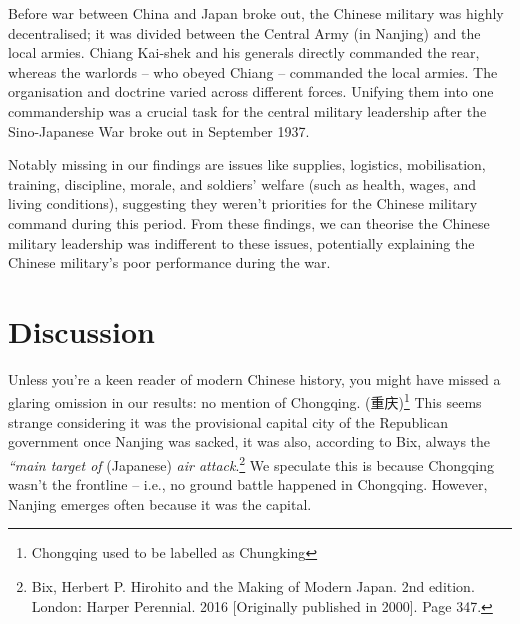 \documentclass[12pt,letterpaper]{article}
\begin{document}
\begin{CJK*}{UTF8}{gbsn}
		\vspace{.35cm}
			
		\noindent Before war between China and Japan broke out, the Chinese military was highly decentralised; it was divided between the Central Army (in Nanjing) and the local armies. Chiang Kai-shek and his generals directly commanded the rear, whereas the warlords – who obeyed Chiang – commanded the local armies. The organisation and doctrine varied across different forces. Unifying them into one commandership was a crucial task for the central military leadership after the Sino-Japanese War broke out in September 1937. 
		
		\vspace{.35cm}
		
		\noindent Notably missing in our findings are issues like supplies, logistics, mobilisation, training, discipline, morale, and soldiers’ welfare (such as health, wages, and living conditions), suggesting they weren’t priorities for the Chinese military command during this period. From these findings, we can theorise the Chinese military leadership was indifferent to these issues, potentially explaining the Chinese military’s poor performance during the war.
		\vspace{.5cm}
		\maketitle
		\section*{Discussion}
		\vspace{.1cm}
		
		Unless you’re a keen reader of modern Chinese history, you might have missed a glaring omission in our results: no mention of Chongqing. (重庆)\footnote{Chongqing used to be labelled as Chungking} This seems strange considering it was the provisional capital city of the Republican government once Nanjing was sacked, it was also, according to Bix, always the \textit{“main target of} (Japanese) \textit{air attack}.\footnote{ Bix, Herbert P. Hirohito and the Making of Modern Japan. 2nd edition. London: Harper Perennial. 2016 [Originally published in 2000]. Page 347.} We speculate this is because Chongqing wasn’t the frontline – i.e., no ground battle happened in Chongqing. However, Nanjing emerges often because it was the capital.
		
		\vspace{.35cm}
		

\end{CJK*}
\end{document}
